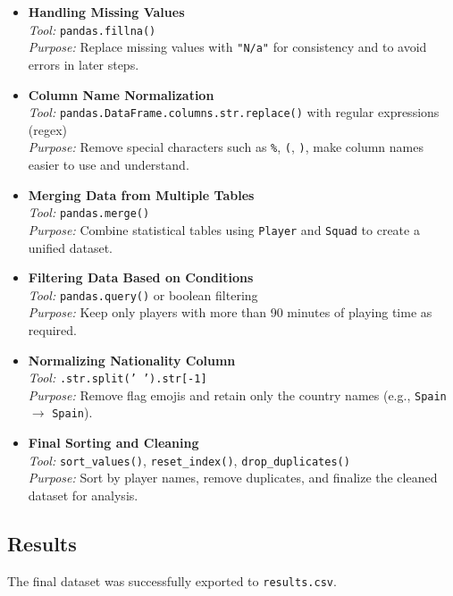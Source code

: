 \documentclass[12pt,a4paper]{article}
\begin{document}
\begin{itemize}
    \item \textbf{Handling Missing Values} \\
    \textit{Tool:} \texttt{pandas.fillna()} \\
    \textit{Purpose:} Replace missing values with \texttt{"N/a"} for consistency and to avoid errors in later steps.

    \item \textbf{Column Name Normalization} \\
    \textit{Tool:} \texttt{pandas.DataFrame.columns.str.replace()} with regular expressions (regex) \\
    \textit{Purpose:} Remove special characters such as \texttt{\%}, \texttt{(}, \texttt{)}, make column names easier to use and understand.

    \item \textbf{Merging Data from Multiple Tables} \\
    \textit{Tool:} \texttt{pandas.merge()} \\
    \textit{Purpose:} Combine statistical tables using \texttt{Player} and \texttt{Squad} to create a unified dataset.

    \item \textbf{Filtering Data Based on Conditions} \\
    \textit{Tool:} \texttt{pandas.query()} or boolean filtering \\
    \textit{Purpose:} Keep only players with more than 90 minutes of playing time as required.

    \item \textbf{Normalizing Nationality Column} \\
    \textit{Tool:} \texttt{.str.split(' ').str[-1]} \\
    \textit{Purpose:} Remove flag emojis and retain only the country names (e.g., \texttt{Spain} $\rightarrow$ \texttt{Spain}).

    \item \textbf{Final Sorting and Cleaning} \\
    \textit{Tool:} \texttt{sort\_values()}, \texttt{reset\_index()}, \texttt{drop\_duplicates()} \\
    \textit{Purpose:} Sort by player names, remove duplicates, and finalize the cleaned dataset for analysis.
\end{itemize}

\subsection{Results}
The final dataset was successfully exported to \texttt{results.csv}.
\end{document}
